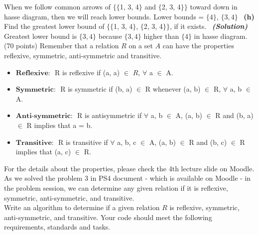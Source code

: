 \documentclass[a4 paper]{article}
\numberwithin{equation}{section}
\newcommand{\problem}[2]{~\\\fbox{\textbf{Problem #1}}\hfill (#2 points)\newline\newline}
\newcommand{\subproblem}[1]{~\newline\textbf{(#1)}}
\newcommand{\solution}{~\newline\textbf{\textit{(Solution)}} }
\newcommand{\0}{\mathbf{0}}
\begin{document}
\newline
When we follow common arrows of $\{\{$1, 3, 4$\}$ and $\{$2, 3, 4$\}\}$ toward down in hasse diagram, then we will reach lower bounds.
\newline
Lower bounds = $\{4\}$, $\{3,4\}$
\newline
\subproblem{h} Find the greatest lower bound of $\{\{$1, 3, 4$\}$, $\{$2, 3, 4$\}\}$,
if it exists.
\solution
\newline
Greatest lower bound is $\{3,4\}$ because  $\{3,4\}$ higher than $\{4\}$ in hasse diagram.
\newline
\newpage
\problem{3: Relations}{70}
Remember that a relation $R$ on a set $A$ can have the properties reflexive, symmetric, anti-symmetric and transitive.

\begin{itemize}
	\item $\textbf{Reflexive: }$ R is reflexive if (a, a) $\in$ $R$, $\forall$ a $\in$ A.
	\item $\textbf{Symmetric: }$ R is symmetric if (b, a) $\in$ R whenever (a, b) $\in$ R, $\forall$ a, b $\in$ A.
	\item $\textbf{Anti-symmetric: }$ R is antisymmetric if $\forall$ a, b $\in$ A, (a, b) $\in$ R and (b, a) $\in$ R implies that a = b.
	\item $\textbf{Transitive: }$ R is transitive if $\forall$ a, b, c $\in$ A, (a, b) $\in$ R and (b, c) $\in$ R implies that (a, c) $\in$ R.
\end{itemize}
For the details about the properties, please check the 4th lecture slide on Moodle. \\

As we solved the problem 3 in PS4 document - which is available on Moodle - in the problem session, we can determine any given relation if it is reflexive, symmetric, anti-symmetric, and transitive.\\

Write an algorithm to determine if a given relation $R$ is reflexive, symmetric, anti-symmetric, and transitive. Your code should meet the following requirements, standards and tasks.
\end{document}
